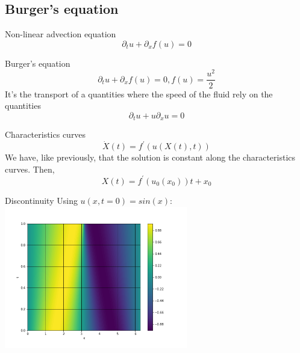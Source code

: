 \documentclass{beamer}
\begin{document}
        \subsection{Burger's equation}
            \begin{frame}{Non-linear advection equation}
                \begin{equation*}
                    \partial_t u+ \partial_x f(u) = 0
                \end{equation*}
            \end{frame}
            \begin{frame}{Burger's equation}
                \begin{equation*}
                    \partial_t u+ \partial_x f(u) = 0, f(u)=\frac{u^2}{2}
                \end{equation*}
                It's the transport of a quantities where the speed of the fluid rely on the quantities 
                \begin{equation*}
                    \partial_t u+ u\partial_x u = 0
                \end{equation*}
            \end{frame}
            
            \begin{frame}{Characteristics curves}
                \begin{equation*}
                    {\dot X}\left(t\right) = f^\prime\left(u \left(X\left(t\right), t\right)\right)
                \end{equation*}
                \pause
                We have, like previously, that the solution is constant along the characteristics curves. Then, 
                \begin{equation*}
                    X\left(t\right) = f^\prime\left(u_0\left(x_0\right)\right)t + x_0
                \end{equation*}
            \end{frame}
            
            \begin{frame}{Discontinuity}
                Using $u(x,t=0) = sin(x) :$
                \includegraphics[width=8cm]{limit.png}
            \end{frame}
            
\end{document}
